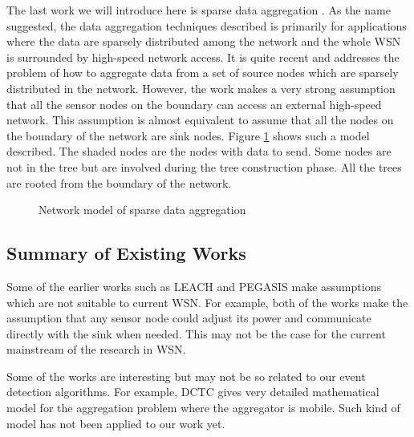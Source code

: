 The last work we will introduce here is sparse data aggregation \cite{doubleruling}. As the name suggested, the data aggregation techniques described is primarily for applications where the data are sparsely distributed among the network and the whole WSN is surrounded by high-speed network access. It is quite recent and addresses the problem of how to aggregate data from a set of source nodes which are sparsely distributed in the network. However, the work makes a very strong assumption that all the sensor nodes on the boundary can access an external high-speed network. This assumption is almost equivalent to assume that all the nodes on the boundary of the network are sink nodes. Figure \ref{fig:doubleruling} shows such a model described. The shaded nodes are the nodes with data to send. Some nodes are not in the tree but are involved during the tree construction phase. All the trees are rooted from the boundary of the network.

\begin{figure}
\centering
{}
\caption{Network model of sparse data aggregation}
\label{fig:doubleruling}
\end{figure}

\subsection{Summary of Existing Works}
Some of the earlier works such as LEACH and PEGASIS \cite{leach, pegasis} make assumptions which are not suitable to current WSN. For example, both of the works make the assumption that any sensor node could adjust its power and communicate directly with the sink when needed. This may not be the case for the current mainstream of the research in WSN.

Some of the works are interesting but may not be so related to our event detection algorithms. For example, DCTC \cite{dctc} gives very detailed mathematical model for the aggregation problem where the aggregator is mobile. Such kind of model has not been applied to our work yet.

